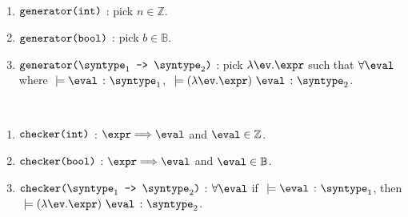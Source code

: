 \begin{definition}
  \label{def_genCore}
  \ \par 
  \begin{enumerate}
    \item $\texttt{generator(int)}$ : pick $n \in \mathbb{Z}$.
    \item $\texttt{generator(bool)}$ : pick $b \in \mathbb{B}$.
    \item $\mkgen{$\mkfun{\syntype_1}{\syntype_2}$}$ : pick $\mklambda{\ev}{\expr}$ such that $\forall \eval$ where $\ \models \hastype{\eval}{\syntype_1}$, $\ \models \hastype{(\mklambda{\ev}{\expr})\ \eval}{\syntype_2}$.
  \end{enumerate}
\end{definition}

\begin{definition}
  \label{def_CheCore}
  \ \par 
  \begin{enumerate}
    \item $\texttt{checker(int)}$ : $\expr \Longrightarrow \eval$ and $\eval \in \mathbb{Z}$.
    \item $\texttt{checker(bool)}$ : $\expr \Longrightarrow \eval$ and $\eval \in \mathbb{B}$.
    \item $\mkche{$\mkfun{\syntype_1}{\syntype_2}$}$ : $\forall \eval$ if $\ \models \hastype{\eval}{\syntype_1}$, then $\ \models \hastype{(\mklambda{\ev}{\expr})\ \eval}{\syntype_2}$.
  \end{enumerate}
\end{definition}